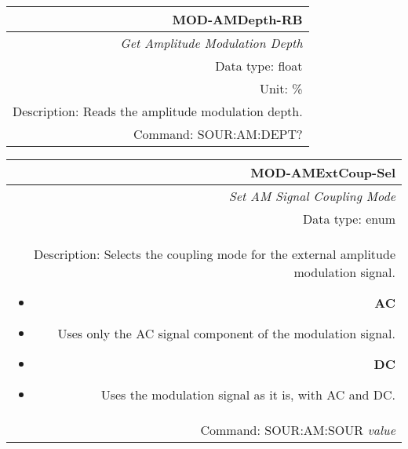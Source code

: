 \documentclass[openany]{article}
\begin{document}
		\begin{tabular}{N}
			\hline
			\bfseries MOD-AMDepth-RB \\ \hline
			\emph{Get Amplitude Modulation Depth} \\
			Data type: float \\
			Unit: \% \\
			Description: Reads the amplitude modulation depth. \\
			Command: SOUR:AM:DEPT? \\

		\end{tabular}
%
		\begin{tabular}{N}
			\hline
			\bfseries MOD-AMExtCoup-Sel \\ \hline
			\emph{Set AM Signal Coupling Mode} \\
			Data type: enum \\  
			Description: Selects the coupling mode for the external amplitude modulation signal.\begin{itemize}[noitemsep]
				\small
				\item[] \textbf{AC} 
				\item[]	Uses only the AC signal component of the modulation signal.
				\item[] \textbf{DC}
				\item[] Uses the modulation signal as it is, with AC and DC.
			\end{itemize} \\
			Command: SOUR:AM:SOUR \emph{value} \\

		\end{tabular}
\end{document}

